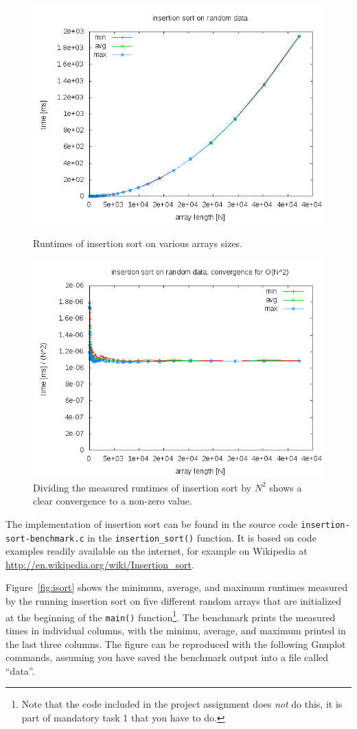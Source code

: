 \documentclass[a4paper,10pt]{article}
\begin{document}
\begin{figure}
  \centering
  \includegraphics[width=0.7\columnwidth]{examples/isort-example.png}
  \caption{
    Runtimes of insertion sort on various arrays sizes.
  }\label{fig:isort}
  \vspace{\baselineskip}
  \centering
  \includegraphics[width=0.7\columnwidth]{examples/isort-example-N2.png}
  \caption{
    Dividing the measured runtimes of insertion sort by $N^2$ shows a clear convergence to a non-zero value.
  }\label{fig:isort-N2}
\end{figure}

The implementation of insertion sort can be found in the source code \texttt{insertion\--sort\--benchmark.c} in the \texttt{insertion\_sort()} function.
It is based on code examples readily available on the internet, for example on Wikipedia at \url{http://en.wikipedia.org/wiki/Insertion_sort}.

Figure~\ref{fig:isort} shows the minimum, average, and maximum runtimes measured by the running insertion sort on five different random arrays that are initialized at the beginning of the \texttt{main()} function\footnote{Note that the code included in the project assignment does \emph{not} do this, it is part of mandatory task 1 that you have to do.}.
The benchmark prints the measured times in individual columns, with the minimu, average, and maximum printed in the last three columns.
The figure can be reproduced with the following Gnuplot commands, assuming you have saved the benchmark output into a file called ``data''.
\end{document}
